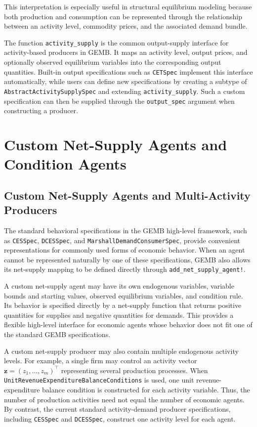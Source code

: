 \documentclass[
  letterpaper,
  DIV=11,
  numbers=noendperiod]{scrreprt}
\begin{document}
This interpretation is especially useful in structural equilibrium
modeling because both production and consumption can be represented
through the relationship between an activity level, commodity prices,
and the associated demand bundle.

The function \texttt{activity\_supply} is the common output-supply
interface for activity-based producers in GEMB. It maps an activity
level, output prices, and optionally observed equilibrium variables into
the corresponding output quantities. Built-in output specifications such
as \texttt{CETSpec} implement this interface automatically, while users
can define new specifications by creating a subtype of
\texttt{AbstractActivitySupplySpec} and extending
\texttt{activity\_supply}. Such a custom specification can then be
supplied through the \texttt{output\_spec} argument when constructing a
producer.

\section{Custom Net-Supply Agents and Condition
Agents}\label{custom-net-supply-agents-and-condition-agents}

\subsection{Custom Net-Supply Agents and Multi-Activity
Producers}\label{custom-net-supply-agents-and-multi-activity-producers}

The standard behavioral specifications in the GEMB high-level framework,
such as \texttt{CESSpec}, \texttt{DCESSpec}, and
\texttt{MarshallDemandConsumerSpec}, provide convenient representations
for commonly used forms of economic behavior. When an agent cannot be
represented naturally by one of these specifications, GEMB also allows
its net-supply mapping to be defined directly through
\texttt{add\_net\_supply\_agent!}.

A custom net-supply agent may have its own endogenous variables,
variable bounds and starting values, observed equilibrium variables, and
condition rule. Its behavior is specified directly by a net-supply
function that returns positive quantities for supplies and negative
quantities for demands. This provides a flexible high-level interface
for economic agents whose behavior does not fit one of the standard GEMB
specifications.

A custom net-supply producer may also contain multiple endogenous
activity levels. For example, a single firm may control an activity
vector \(\mathbf z=(z_1,\ldots,z_m)^\top\) representing several
production processes. When
\texttt{UnitRevenueExpenditureBalanceConditions} is used, one unit
revenue-expenditure balance condition is constructed for each activity
variable. Thus, the number of production activities need not equal the
number of economic agents. By contrast, the current standard
activity-demand producer specifications, including \texttt{CESSpec} and
\texttt{DCESSpec}, construct one activity level for each agent.
\end{document}
